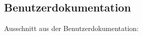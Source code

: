 \subsection{Benutzerdokumentation}
\label{app:BenutzerDoku}
Ausschnitt aus der Benutzerdokumentation:



